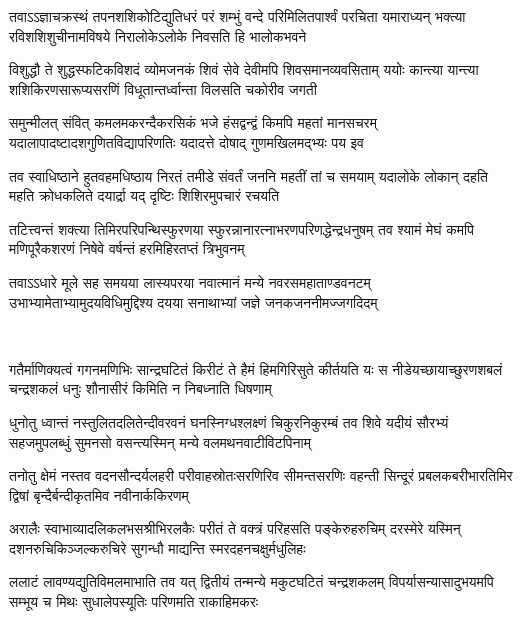 \fourlineindentedshloka
{तवाऽऽज्ञाचक्रस्थं तपनशशिकोटिद्युतिधरं}
{परं शम्भुं वन्दे परिमिलितपार्श्वं परचिता}
{यमाराध्यन् भक्त्या रविशशिशुचीनामविषये}
{निरालोकेऽलोके निवसति हि भालोकभवने}%

\fourlineindentedshloka
{विशुद्धौ ते शुद्धस्फटिकविशदं व्योमजनकं}
{शिवं सेवे देवीमपि शिवसमानव्यवसिताम्}
{ययोः कान्त्या यान्त्या शशिकिरणसारूप्यसरणिं}
{विधूतान्तर्ध्वान्ता विलसति चकोरीव जगती}%

\fourlineindentedshloka
{समुन्मीलत् संवित् कमलमकरन्दैकरसिकं}
{भजे हंसद्वन्द्वं किमपि महतां मानसचरम्}
{यदालापादष्टादशगुणितविद्यापरिणतिः}
{यदादत्ते दोषाद् गुणमखिलमद्भ्यः पय इव}%

\fourlineindentedshloka
{तव स्वाधिष्ठाने हुतवहमधिष्ठाय निरतं}
{तमीडे संवर्तं जननि महतीं तां च समयाम्}
{यदालोके लोकान् दहति महति क्रोधकलिते}
{दयार्द्रा यद् दृष्टिः शिशिरमुपचारं रचयति}%

\fourlineindentedshloka
{तटित्त्वन्तं शक्त्या तिमिरपरिपन्थिस्फुरणया}
{स्फुरन्नानारत्नाभरणपरिणद्धेन्द्रधनुषम्}
{तव श्यामं मेघं कमपि मणिपूरैकशरणं}
{निषेवे वर्षन्तं हरमिहिरतप्तं त्रिभुवनम्}%

\fourlineindentedshloka
{तवाऽऽधारे मूले सह समयया लास्यपरया}
{नवात्मानं मन्ये नवरसमहाताण्डवनटम्}
{उभाभ्यामेताभ्यामुदयविधिमुद्दिश्य दयया}
{सनाथाभ्यां जज्ञे जनकजननीमज्जगदिदम्}%

\mbox{}\\

\fourlineindentedshloka
{गतैर्माणिक्यत्वं गगनमणिभिः सान्द्रघटितं}
{किरीटं ते हैमं हिमगिरिसुते कीर्तयति यः}
{स नीडेयच्छायाच्छुरणशबलं चन्द्रशकलं}
{धनुः शौनासीरं किमिति न निबध्नाति धिषणाम्}%

\fourlineindentedshloka
{धुनोतु ध्वान्तं नस्तुलितदलितेन्दीवरवनं}
{घनस्निग्धश्लक्ष्णं चिकुरनिकुरम्बं तव शिवे}
{यदीयं सौरभ्यं सहजमुपलब्धुं सुमनसो}
{वसन्त्यस्मिन् मन्ये वलमथनवाटीविटपिनाम्}%

\fourlineindentedshloka
{तनोतु क्षेमं नस्तव वदनसौन्दर्यलहरी}
{परीवाहस्रोतःसरणिरिव सीमन्तसरणिः}
{वहन्ती सिन्दूरं प्रबलकबरीभारतिमिर}
{द्विषां बृन्दैर्बन्दीकृतमिव नवीनार्ककिरणम्}%

\fourlineindentedshloka
{अरालैः स्वाभाव्यादलिकलभसश्रीभिरलकैः}
{परीतं ते वक्त्रं परिहसति पङ्केरुहरुचिम्}
{दरस्मेरे यस्मिन् दशनरुचिकिञ्जल्करुचिरे}
{सुगन्धौ माद्यन्ति स्मरदहनचक्षुर्मधुलिहः}%

\fourlineindentedshloka
{ललाटं लावण्यद्युतिविमलमाभाति तव यत्}
{द्वितीयं तन्मन्ये मकुटघटितं चन्द्रशकलम्}
{विपर्यासन्यासादुभयमपि सम्भूय च मिथः}
{सुधालेपस्यूतिः परिणमति राकाहिमकरः}%

